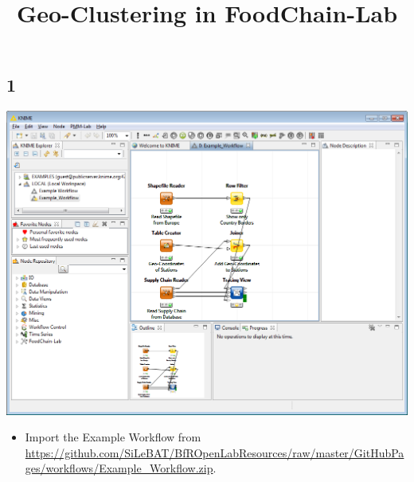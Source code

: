 \documentclass{beamer}
\title{Geo-Clustering in FoodChain-Lab}
\date{}
\begin{document}
\maketitle

\section{ }
 
\subsection{1}
\begin{frame}
	\begin{center}
  		\includegraphics[height=0.6\textheight]{1.png}
	\end{center}
	\begin{itemize}
		\item Import the Example Workflow from \url{https://github.com/SiLeBAT/BfROpenLabResources/raw/master/GitHubPages/workflows/Example_Workflow.zip}.
	\end{itemize}
\end{frame}
\end{document}
